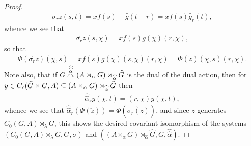 \begin{proof}
	\begin{align*}
		\sigma_r z(s,t) = x f(s) + \hat g(t+r) = x f(s) \hat g_r(t),
	\end{align*}
	whence we see that
	\begin{align*}
		\check{ \sigma_r z}(s,\chi) = x f(s) g(\chi) (r,\chi),
	\end{align*}
	so that
	\begin{align*}
	\Phi(\check{ \sigma_r z})(\chi,s) = x f(s) g(\chi)(s,\chi)(r,\chi) = \Phi(\check z)(\chi,s) (r,\chi).
	\end{align*}
	Note also, that if $G \stackrel{\widehat{\widehat{\alpha}}}{\curvearrowright} (A \rtimes_\alpha G) \rtimes_{\widehat{\alpha}} \widehat{G}$ is the dual of the dual action, then for $y \in C_c(\widehat{G} \times G, A) \subseteq (A \rtimes_\alpha G) \rtimes_{\widehat{\alpha}} \widehat{G}$ then
	\begin{align*}
		\hat{\hat{\alpha}}_r y(\chi,t) = (r,\chi) y(\chi,t),
	\end{align*}
	whence we see that $\hat{\hat{\alpha}}_r(\Phi(\check z))= \Phi(\check{\sigma_r (z)})$, and since $z$ generates $C_0(G,A) \rtimes_\lambda G$, this shows the desired covariant isomorphism of the systems $(C_0(G,A) \rtimes_\lambda G, G, \sigma)$ and $( (A \rtimes_\alpha G)\rtimes_{\hat{\alpha}} \hat G, G, \hat{\hat{\alpha}})$.
\end{proof}
